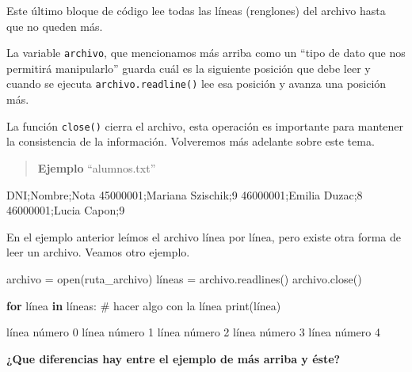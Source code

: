 \documentclass[
  letterpaper,
  DIV=11,
  numbers=noendperiod]{scrreprt}
\newenvironment{Shaded}{\begin{snugshade}}{\end{snugshade}}
\newcommand{\BuiltInTok}[1]{\textcolor[rgb]{0.00,0.23,0.31}{#1}}
\newcommand{\CommentTok}[1]{\textcolor[rgb]{0.37,0.37,0.37}{#1}}
\newcommand{\ControlFlowTok}[1]{\textcolor[rgb]{0.00,0.23,0.31}{\textbf{#1}}}
\newcommand{\ExtensionTok}[1]{\textcolor[rgb]{0.00,0.23,0.31}{#1}}
\newcommand{\KeywordTok}[1]{\textcolor[rgb]{0.00,0.23,0.31}{\textbf{#1}}}
\newcommand{\NormalTok}[1]{\textcolor[rgb]{0.00,0.23,0.31}{#1}}
\newcommand{\OperatorTok}[1]{\textcolor[rgb]{0.37,0.37,0.37}{#1}}
\begin{document}
Este último bloque de código lee todas las líneas (renglones) del
archivo hasta que no queden más.

La variable \texttt{archivo}, que mencionamos más arriba como un ``tipo
de dato que nos permitirá manipularlo'' guarda cuál es la siguiente
posición que debe leer y cuando se ejecuta \texttt{archivo.readline()}
lee esa posición y avanza una posición más.

La función \texttt{close()} cierra el archivo, esta operación es
importante para mantener la consistencia de la información. Volveremos
más adelante sobre este tema.

\begin{quote}
\textbf{Ejemplo} ``alumnos.txt''
\end{quote}

\begin{Shaded}
\begin{Highlighting}[]
\NormalTok{DNI;Nombre;Nota}
\NormalTok{45000001;Mariana Szischik;9}
\NormalTok{46000001;Emilia Duzac;8}
\NormalTok{46000001;Lucia Capon;9}
\end{Highlighting}
\end{Shaded}

En el ejemplo anterior leímos el archivo línea por línea, pero existe
otra forma de leer un archivo. Veamos otro ejemplo.

\begin{Shaded}
\begin{Highlighting}[]
\NormalTok{archivo }\OperatorTok{=} \BuiltInTok{open}\NormalTok{(ruta\_archivo)}
\NormalTok{líneas }\OperatorTok{=}\NormalTok{ archivo.readlines()}
\NormalTok{archivo.close()}

\ControlFlowTok{for}\NormalTok{ línea }\KeywordTok{in}\NormalTok{ líneas:}
  \CommentTok{\# hacer algo con la línea}
  \BuiltInTok{print}\NormalTok{(línea)}
\end{Highlighting}
\end{Shaded}

\begin{Shaded}
\begin{Highlighting}[]
\ExtensionTok{línea}\NormalTok{ número 0 }
\ExtensionTok{línea}\NormalTok{ número 1 }
\ExtensionTok{línea}\NormalTok{ número 2 }
\ExtensionTok{línea}\NormalTok{ número 3 }
\ExtensionTok{línea}\NormalTok{ número 4 }
\end{Highlighting}
\end{Shaded}

\textbf{¿Que diferencias hay entre el ejemplo de más arriba y éste?}
\end{document}
